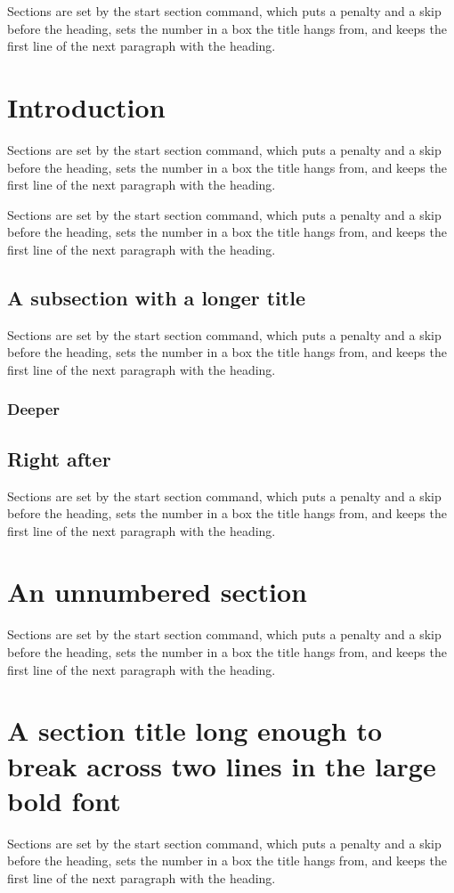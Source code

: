 \documentclass{article}
\begin{document}
Sections are set by the start section command, which puts a penalty and a skip before the heading, sets the number in a box the title hangs from, and keeps the first line of the next paragraph with the heading.

\section{Introduction}
Sections are set by the start section command, which puts a penalty and a skip before the heading, sets the number in a box the title hangs from, and keeps the first line of the next paragraph with the heading.

Sections are set by the start section command, which puts a penalty and a skip before the heading, sets the number in a box the title hangs from, and keeps the first line of the next paragraph with the heading.

\subsection{A subsection with a longer title}
Sections are set by the start section command, which puts a penalty and a skip before the heading, sets the number in a box the title hangs from, and keeps the first line of the next paragraph with the heading.
\subsubsection{Deeper}
\subsection{Right after}
Sections are set by the start section command, which puts a penalty and a skip before the heading, sets the number in a box the title hangs from, and keeps the first line of the next paragraph with the heading.

\section*{An unnumbered section}
Sections are set by the start section command, which puts a penalty and a skip before the heading, sets the number in a box the title hangs from, and keeps the first line of the next paragraph with the heading.

\section{A section title long enough to break across two lines in the large bold font}
Sections are set by the start section command, which puts a penalty and a skip before the heading, sets the number in a box the title hangs from, and keeps the first line of the next paragraph with the heading.
\end{document}
